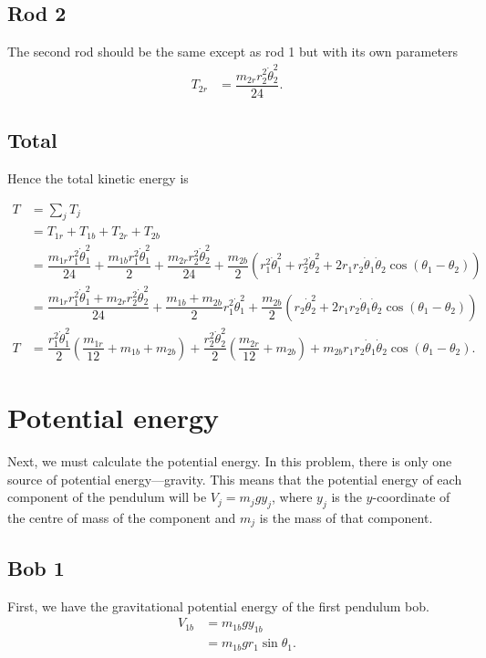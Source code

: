 \documentclass[12pt,a4paper,portrait]{article}
\begin{document}
	\subsection{Rod 2}
	The second rod should be the same except as rod 1 but with its own parameters
	\begin{align*}
		T_{2r} &= \dfrac{m_{2r} r_2^2\dot{\theta}_2^2}{24}.
	\end{align*}
	
	\subsection{Total}
	Hence the total kinetic energy is
	
	\begin{align*}
		T &= \sum_j T_j \\
		&= T_{1r} + T_{1b} + T_{2r} + T_{2b} \\
		&= \dfrac{m_{1r}r_1^2\dot{\theta}_1^2}{24} + \dfrac{m_{1b} r_1^2 \dot{\theta}_1^2}{2} + \dfrac{m_{2r} r_2^2\dot{\theta}_2^2}{24} + \dfrac{m_{2b}}{2} \left(r_1^2 \dot{\theta}_1^2 + r_2^2 \dot{\theta}_2^2 + 2r_1 r_2 \dot{\theta}_1 \dot{\theta}_2 \cos{\left(\theta_1-\theta_2\right)}\right) \\
		&= \dfrac{m_{1r} r_1^2 \dot{\theta}_1^2 + m_{2r}r_2^2 \dot{\theta}_2^2}{24} + \dfrac{m_{1b}+m_{2b}}{2}r_1^2 \dot{\theta}_1^2 + \dfrac{m_{2b}}{2} \left(r_2\dot{\theta}_2^2 + 2r_1 r_2 \dot{\theta}_1 \dot{\theta}_2 \cos{\left(\theta_1 - \theta_2\right)}\right)
	\end{align*}
	\begin{align*}
		T &= \dfrac{r_1^2 \dot{\theta}_1^2}{2} \left(\dfrac{m_{1r}}{12} + m_{1b} + m_{2b}\right) + \dfrac{r_2^2 \dot{\theta}_2^2}{2} \left(\dfrac{m_{2r}}{12} + m_{2b}\right) + m_{2b}r_1 r_2 \dot{\theta}_1 \dot{\theta}_2 \cos{(\theta_1-\theta_2)}.
	\end{align*}
	
	\section{Potential energy}
	Next, we must calculate the potential energy. In this problem, there is only one source of potential energy---gravity. This means that the potential energy of each component of the pendulum will be $V_j = m_jgy_j$, where $y_j$ is the $y$-coordinate of the centre of mass of the component and $m_j$ is the mass of that component. 
	
	\subsection{Bob 1}
	First, we have the gravitational potential energy of the first pendulum bob. 
	\begin{align*}
		V_{1b} &= m_{1b} gy_{1b} \\
		&= m_{1b}gr_1 \sin{\theta_1}.
	\end{align*}
	
\end{document}
